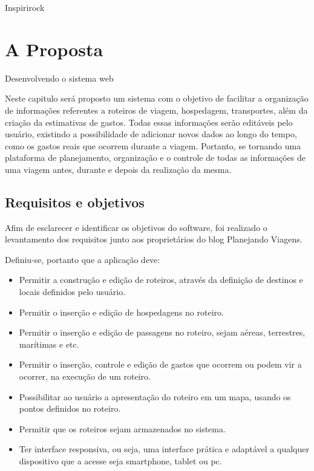 \documentclass[cic,tc]{iiufrgs}
\begin{document}
Inspirirock

\chapter{A Proposta}
Desenvolvendo o sistema web

Neste capitulo será proposto um sistema com o objetivo de facilitar a organização de informações referentes a roteiros de viagem, hospedagem, transportes, além da criação da estimativas de gastos. Todas essas informações serão editáveis pelo usuário, existindo a possibilidade de adicionar novos dados ao longo do tempo, como os gastos reais que ocorrem durante a viagem. Portanto, se tornando uma plataforma de planejamento, organização e o controle de todas as informações de uma viagem antes, durante e depois da realização da mesma. 

\section{Requisitos e objetivos}

Afim de esclarecer e identificar os objetivos do software, foi realizado o levantamento dos requisitos junto aos proprietários do blog Planejando Viagens.

Definiu-se, portanto que a aplicação deve:

\begin{itemize}
    \item Permitir a construção e edição de roteiros, através da definição de destinos e locais definidos pelo usuário.
    \item Permitir o inserção e edição de hospedagens no roteiro.
    \item Permitir o inserção e edição de passagens no roteiro, sejam aéreas, terrestres, marítimas e etc.
    \item Permitir o inserção, controle e edição de gastos que ocorrem ou podem vir a ocorrer, na execução de um roteiro.
    \item Possibilitar ao usuário a apresentação do roteiro em um mapa, usando os pontos definidos no roteiro.
    \item Permitir que os roteiros sejam armazenados no sistema.
    \item Ter interface responsiva, ou seja, uma interface prática e adaptável a qualquer dispositivo que a acesse seja smartphone, tablet ou pc.

\end{itemize}
\end{document}
